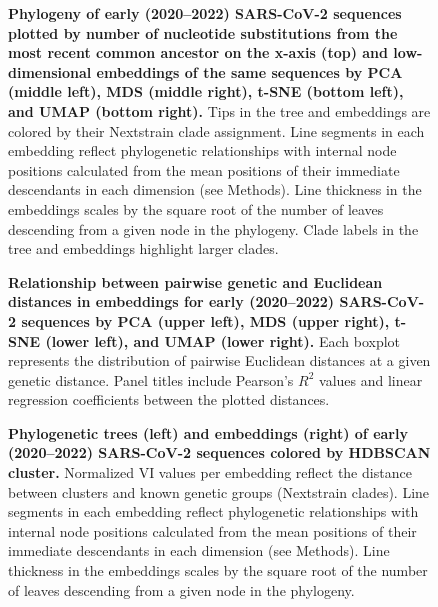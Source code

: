 \documentclass[webpdf,contemporary,large,single]{oup-authoring-template}%
\theoremstyle{thmstyleone}%
\theoremstyle{thmstyletwo}%
\theoremstyle{thmstylethree}%
\begin{document}
\begin{figure}[H]
\caption{{\bf Phylogeny of early (2020--2022) SARS-CoV-2 sequences plotted by number of nucleotide substitutions from the most recent common ancestor on the x-axis (top) and low-dimensional embeddings of the same sequences by PCA (middle left), MDS (middle right), t-SNE (bottom left), and UMAP (bottom right).}
  Tips in the tree and embeddings are colored by their Nextstrain clade assignment.
  Line segments in each embedding reflect phylogenetic relationships with internal node positions calculated from the mean positions of their immediate descendants in each dimension (see Methods).
  Line thickness in the embeddings scales by the square root of the number of leaves descending from a given node in the phylogeny.
  Clade labels in the tree and embeddings highlight larger clades.
}\label{fig:sars-cov-2-early-embeddings-by-Nextstrain-clade}
\end{figure}

\begin{figure}[H]
\caption{{\bf Relationship between pairwise genetic and Euclidean distances in embeddings for early (2020--2022) SARS-CoV-2 sequences by PCA (upper left), MDS (upper right), t-SNE (lower left), and UMAP (lower right).}
  Each boxplot represents the distribution of pairwise Euclidean distances at a given genetic distance.
  Panel titles include Pearson's $R^{2}$ values and linear regression coefficients between the plotted distances.
}\label{fig:sars-cov-2-pairwise-distances}
\end{figure}

\begin{figure}[H]
\caption{{\bf Phylogenetic trees (left) and embeddings (right) of early (2020--2022) SARS-CoV-2 sequences colored by HDBSCAN cluster.}
  Normalized VI values per embedding reflect the distance between clusters and known genetic groups (Nextstrain clades).
  Line segments in each embedding reflect phylogenetic relationships with internal node positions calculated from the mean positions of their immediate descendants in each dimension (see Methods).
  Line thickness in the embeddings scales by the square root of the number of leaves descending from a given node in the phylogeny.
}\label{fig:sars-cov-2-2020-2022-clusters-vs-Nextstrain-clade}
\end{figure}
\end{document}
